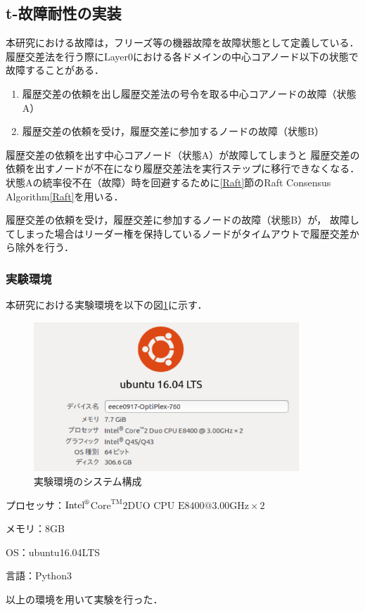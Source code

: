 \documentclass[a4paper,12pt]{jsarticle}
\begin{document}
\subsection{t-故障耐性の実装}
本研究における故障は，フリーズ等の機器故障を故障状態として定義している．
履歴交差法を行う際にLayer0における各ドメインの中心コアノード以下の状態で故障することがある．

\begin{enumerate}
  \item 履歴交差の依頼を出し履歴交差法の号令を取る中心コアノードの故障（状態A）\\
  \hspace{12mm} 
  \item 履歴交差の依頼を受け，履歴交差に参加するノードの故障（状態B）\\
  \hspace{12mm} 
\end{enumerate}

履歴交差の依頼を出す中心コアノード（状態A）が故障してしまうと
履歴交差の依頼を出すノードが不在になり履歴交差法を実行ステップに移行できなくなる．
状態Aの統率役不在（故障）時を回避するために\ref{Raft}節のRaft Consensus Algorithm\ref{Raft}を用いる．

履歴交差の依頼を受け，履歴交差に参加するノードの故障（状態B）が，
故障してしまった場合はリーダー権を保持しているノードがタイムアウトで履歴交差から除外を行う．


\subsubsection{実験環境}
本研究における実験環境を以下の図\ref{fig:kankyou}に示す．
\begin{figure}[H]%
  \begin{center}
    \includegraphics[width=100mm]{pht/kankyou.eps}
  \end{center}
  \caption{実験環境のシステム構成}
  \label{fig:kankyou}
\end{figure}
%
\begin{description}
  \item プロセッサ：$\text{Intel}^\text{\textregistered}$$\text{Core}^\text{TM}\text{2DUO CPU E8400@3.00GHz}\times2$
  \item メモリ：$8$GB
  \item OS：ubuntu16.04LTS
  \item 言語：Python3
\end{description}
以上の環境を用いて実験を行った．
\end{document}
